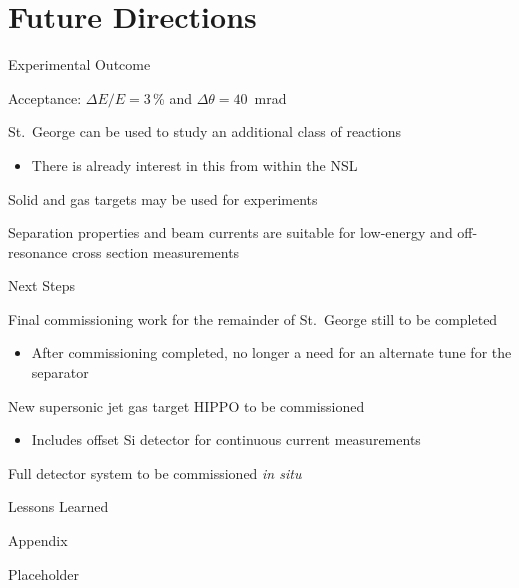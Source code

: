 \documentclass[10pt]{beamer}
\begin{document}
\section{Future Directions}

\begin{frame}[fragile]{Experimental Outcome}

    Acceptance: $\Delta E/E = 3$\,\% and $\Delta\theta = 40$~mrad

    St.\ George can be used to study an additional class of reactions
    \begin{itemize}
        \item There is already interest in this from within the NSL
    \end{itemize}

    Solid and gas targets may be used for experiments

    Separation properties and beam currents are suitable for low-energy
    and off-resonance cross section measurements

\end{frame}

\begin{frame}[fragile]{Next Steps}

    Final commissioning work for the remainder of St.\ George still to
    be completed
    \begin{itemize}
        \item After commissioning completed, no longer a need for an
            alternate tune for the separator
    \end{itemize}

    New supersonic jet gas target HIPPO to be commissioned
    \begin{itemize}
        \item Includes offset Si detector for continuous current
            measurements
    \end{itemize}

    Full detector system to be commissioned \emph{in situ}

\end{frame}

\begin{frame}[fragile]{Lessons Learned}


\end{frame}

\appendix


\begin{frame}[fragile]{Appendix}  %

    Placeholder

\end{frame}

%   
%   
\end{document}
